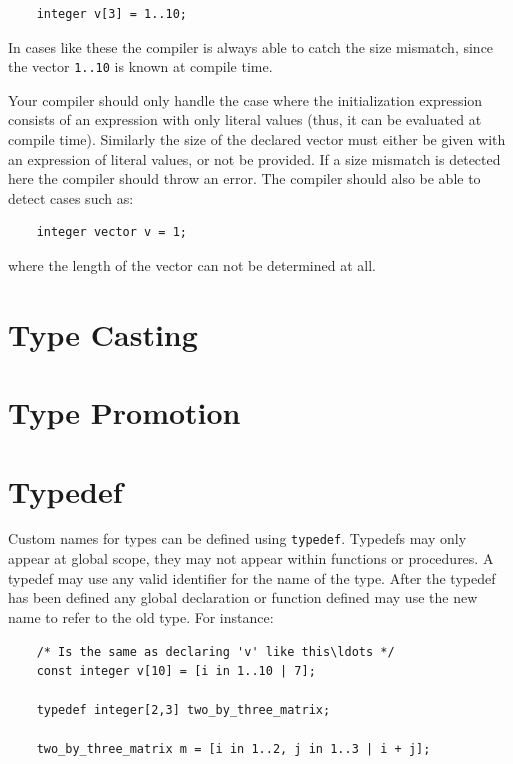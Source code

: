 \documentclass{article}
\begin{document}
  \begin{lstlisting}
    integer v[3] = 1..10;
  \end{lstlisting}

  In cases like these the compiler is always able to catch the size mismatch, since the vector \texttt{1..10} is known
  at compile time.

  Your compiler should only handle the case where the initialization expression consists of an expression with only
  literal values (thus, it can be evaluated at compile time). Similarly the size of the declared vector must either be
  given with an expression of literal values, or not be provided. If a size mismatch is detected here the compiler
  should throw an error. The compiler should also be able to detect cases such as:

  \begin{lstlisting}
    integer vector v = 1;
  \end{lstlisting}

  where the length of the vector can not be determined at all.


\section{Type Casting}
\label{sec:typeCasting}


\section{Type Promotion}
\label{sec:typePromotion}


\section{Typedef}\label{sec:typedef}

  Custom names for types can be defined using \texttt{typedef}. Typedefs may only appear at global scope, they may not
  appear within functions or procedures. A typedef may use any valid identifier for the name of the type. After the
  typedef has been defined any global declaration or function defined may use the new name to refer to the old type.
  For instance:

  \begin{lstlisting}
    /* Is the same as declaring 'v' like this\ldots */
    const integer v[10] = [i in 1..10 | 7];

    typedef integer[2,3] two_by_three_matrix;

    two_by_three_matrix m = [i in 1..2, j in 1..3 | i + j];
  \end{lstlisting}
\end{document}
